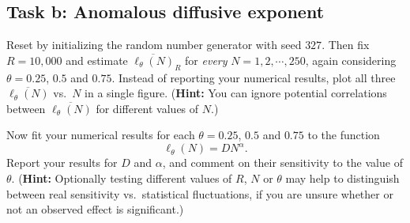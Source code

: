 \documentclass[12 pt]{article} %
\newcommand{\al}{\ensuremath{\alpha} }
\newcommand{\showmarks}[1]{\rightline{\texttt{[#1 marks]}}} %
\begin{document}
\showmarks{12}

\subsection*{Task b: Anomalous diffusive exponent}
Reset by initializing the random number generator with seed $327$.
Then fix $R = 10{,}000$ and estimate $\overline{\ell_{\theta}(N)}_R$ for \textit{every} $N = 1, 2, \cdots, 250$, again considering $\theta = 0.25$, $0.5$ and $0.75$.
Instead of reporting your numerical results, plot all three $\overline{\ell_{\theta}(N)}$ vs.\ $N$ in a single figure.
(\textbf{Hint:} You can ignore potential correlations between $\overline{\ell_{\theta}(N)}$ for different values of $N$.)

\showmarks{8}

Now fit your numerical results for each $\theta = 0.25$, $0.5$ and $0.75$ to the function
\begin{equation*}
  \ell_{\theta}(N) = D N^{\al}.
\end{equation*}
Report your results for $D$ and $\al$, and comment on their sensitivity to the value of $\theta$.
(\textbf{Hint:} Optionally testing different values of $R$, $N$ or $\theta$ may help to distinguish between real sensitivity vs.\ statistical fluctuations, if you are unsure whether or not an observed effect is significant.)

\showmarks{10}



\end{document}
